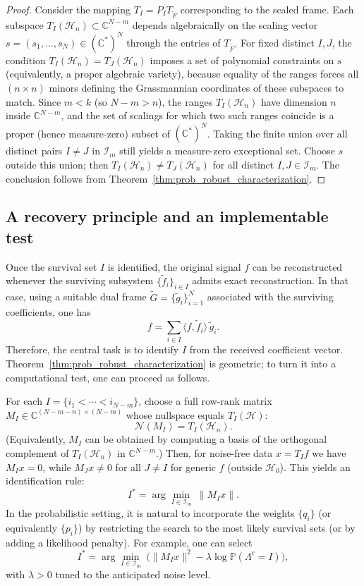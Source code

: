 \documentclass[final,1p,times]{elsarticle}
\begin{document}
\begin{proof}
Consider the mapping $T_I=P_IT_{\widetilde F}$ corresponding to the scaled frame.
Each subspace $T_I(\mathcal H_n)\subset\mathbb C^{N-m}$ depends algebraically on the scaling vector
$s=(s_1,\dots,s_N)\in(\mathbb C^\ast)^N$ through the entries of $T_{\widetilde F}$.
For fixed distinct $I,J$, the condition $T_I(\mathcal H_n)=T_J(\mathcal H_n)$ imposes a set of polynomial constraints on $s$
(equivalently, a proper algebraic variety), because equality of the ranges forces all $(n\times n)$ minors defining the
Grassmannian coordinates of these subspaces to match.
Since $m<k$ (so $N-m>n$), the ranges $T_I(\mathcal H_n)$ have dimension $n$ inside $\mathbb C^{N-m}$, and the set of scalings
for which two such ranges coincide is a proper (hence measure-zero) subset of $(\mathbb C^\ast)^N$.
Taking the finite union over all distinct pairs $I\neq J$ in $\mathcal I_m$ still yields a measure-zero exceptional set.
Choose $s$ outside this union; then $T_I(\mathcal H_n)\neq T_J(\mathcal H_n)$ for all distinct $I,J\in\mathcal I_m$.
The conclusion follows from Theorem~\ref{thm:prob_robust_characterization}.
\end{proof}

\subsection{A recovery principle and an implementable test}

Once the survival set $I$ is identified, the original signal $f$ can be reconstructed whenever the surviving subsystem
$\{\widetilde f_i\}_{i\in I}$ admits exact reconstruction. In that case, using a suitable dual frame
$\widetilde G=\{\widetilde g_i\}_{i=1}^N$ associated with the surviving coefficients, one has
\[
f=\sum_{i\in I}\langle f,\widetilde f_i\rangle\,\widetilde g_i.
\]
Therefore, the central task is to identify $I$ from the received coefficient vector.
Theorem~\ref{thm:prob_robust_characterization} is geometric; to turn it into a computational test, one can proceed as follows.

For each $I=\{i_1<\cdots<i_{N-m}\}$, choose a full row-rank matrix $M_I\in\mathbb C^{(N-m-n)\times (N-m)}$
whose nullspace equals $T_I(\mathcal H)$:
\[
\mathcal N(M_I)=T_I(\mathcal H_n).
\]
(Equivalently, $M_I$ can be obtained by computing a basis of the orthogonal complement of $T_I(\mathcal H_n)$ in
$\mathbb C^{N-m}$.) Then, for noise-free data $x=T_I f$ we have $M_I x=0$, while $M_J x\neq 0$ for all $J\neq I$ for
generic $f$ (outside $\mathcal H_0$). This yields an identification rule:
\[
I^\ast=\arg\min_{I\in\mathcal I_m}\ \|M_I x\|.
\]
In the probabilistic setting, it is natural to incorporate the weights $\{q_i\}$ (or equivalently $\{p_i\}$) by restricting
the search to the most likely survival sets (or by adding a likelihood penalty).
For example, one can select
\[
I^\ast=\arg\min_{I\in\mathcal I_m}\ \big(\|M_I x\|^2-\lambda\log\mathbb P(\Lambda^c=I)\big),
\]
with $\lambda>0$ tuned to the anticipated noise level.
\end{document}
